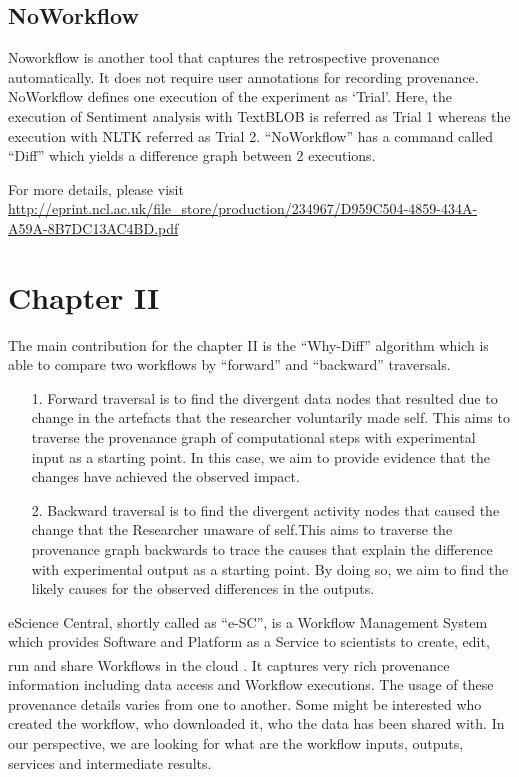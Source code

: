 \documentclass[10pt,conference,twocolumn]{IEEEtran}
\begin{document}
\subsection{NoWorkflow}
Noworkflow is another tool that captures the retrospective provenance automatically. It does not require user annotations for recording provenance. NoWorkflow defines one execution of the experiment as ‘Trial’. Here, the execution of Sentiment analysis with TextBLOB is referred as Trial 1 whereas  the execution with NLTK referred as Trial 2.
\enquote{NoWorkflow} has a command called \enquote{Diff} which yields a difference graph between 2 executions. 

For more details, please visit \url{http://eprint.ncl.ac.uk/file_store/production/234967/D959C504-4859-434A-A59A-8B7DC13AC4BD.pdf}

\section{Chapter II}
The main contribution for the chapter II is the \enquote{Why-Diff} algorithm which is able to compare two workflows by \enquote{forward} and \enquote{backward} traversals. 

\begin{enumerate} \label{data}
\item[1.] Forward traversal is to find the divergent data nodes that resulted due to change in the artefacts that the researcher voluntarily made self. This aims to traverse the provenance graph of computational steps with experimental input as a starting point. In this case, we aim to provide evidence that the changes have achieved the observed impact.
\item[2.] Backward traversal is to find the divergent activity nodes that caused the change that the Researcher unaware of self.This aims to traverse the provenance graph backwards to trace the causes that explain the difference with experimental output as a starting point. By doing so, we aim to find the likely causes for the observed differences in the outputs.
\end{enumerate}
eScience Central, shortly called as \enquote{e-SC}, is a Workflow Management System which provides Software and Platform as a Service to scientists to create, edit, run and share Workflows in the cloud \textsuperscript{\cite{Hiden2012}}. It captures very rich provenance information including data access and Workflow executions. The usage of these provenance details varies from one to another. Some might be interested who created the workflow, who downloaded it, who the data has been shared with. In our perspective, we are looking for what are the workflow inputs, outputs, services and intermediate results.  
\end{document}

